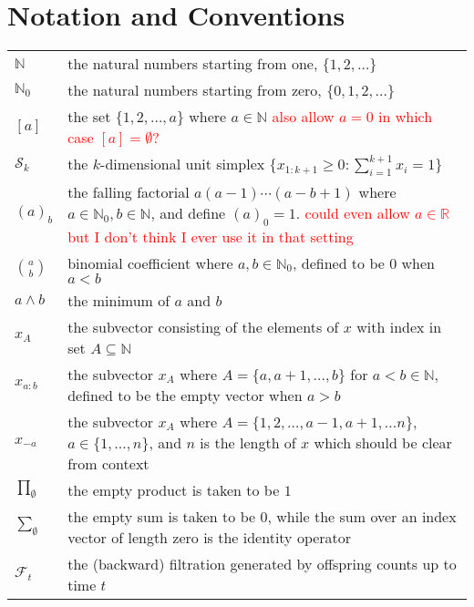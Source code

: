 \documentclass[oneside]{scrbook} %
\newcommand{\seb}[1]{\xspace\textcolor{red}{#1}\xspace} %
\theoremstyle{definition}
\newcommand{\1}[1]{\mathbbm{1}_{#1}} %
\begin{document}
\chapter{Notation and Conventions}

\begin{longtable}{p{} p{}}
$\mathbb{N}$ & the natural numbers starting from one, $\{1,2,\dots \}$ \\
$\mathbb{N}_0$ & the natural numbers starting from zero, $\{0,1,2,\dots \}$ \\
$[a]$ & the set $\{1,2,\dots,a\}$ where $a\in\mathbb{N}$ \seb{also allow $a=0$ in which case $[a] = \emptyset$?} \\
$\mathcal{S}_k$ & the $k$-dimensional unit simplex $\{ x_{1:k+1} \geq 0 : \sum_{i=1}^{k+1} x_i = 1 \}$ \\
$(a)_b$ & the falling factorial $a (a-1) \cdots (a-b+1)$ 
    where $a \in \mathbb{N}_0, b \in \mathbb{N}$, and define $(a)_0 = 1$. \seb{could even allow $a\in\mathbb{R}$ but I don't think I ever use it in that setting} \\
$\binom{a}{b}$ & binomial coefficient where $a,b \in \mathbb{N}_0$, defined to be $0$ when $a<b$ \\
$a \wedge b$ & the minimum of $a$ and $b$ \\
$x_A$ & the subvector consisting of the elements of $x$ with index in set $A\subseteq\mathbb{N}$ \\
$x_{a:b}$ & the subvector $x_A$ where $A = \{a,a+1, \dots,b\}$ for $a<b\in\mathbb{N}$, defined to be the empty vector when $a>b$ \\
$x_{-a}$ & the subvector $x_A$ where $A = \{1,2, \dots, a-1, a+1, \dots n\}$, $a\in\{1,\dots,n\}$, and $n$ is the length of $x$ which should be clear from context \\
$\prod_{\emptyset}$ & the empty product is taken to be $1$ \\
$\sum_{\emptyset}$ & the empty sum is taken to be $0$, while the sum over
    an index vector of length zero is the identity operator \\
$\mathcal{F}_{t}$ & the (backward) filtration generated by offspring counts 
    up to time $t$ \\

\end{longtable}
\end{document}
